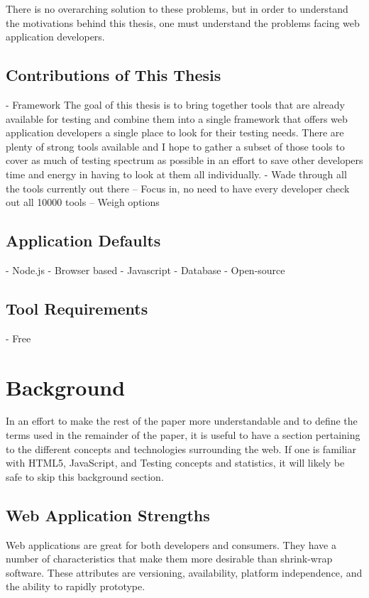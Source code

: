 \documentclass[11pt]{article}
\begin{document}
There is no overarching solution to these problems, but in order to understand the motivations behind this thesis, one must understand the problems facing web application developers.

\subsection{Contributions of This Thesis}
- Framework
The goal of this thesis is to bring together tools that are already available for testing and combine them into a single framework that offers web application developers a single place to look for their testing needs. There are plenty of strong tools available and I hope to gather a subset of those tools to cover as much of testing spectrum as possible in an effort to save other developers time and energy in having to look at them all individually.
- Wade through all the tools currently out there
-- Focus in, no need to have every developer check out all 10000 tools
-- Weigh options

\subsection{Application Defaults }
- Node.js
- Browser based
- Javascript
- Database
- Open-source

\subsection{Tool Requirements }
- Free

\section{Background}
In an effort to make the rest of the paper more understandable and to define the terms used in the remainder of the paper, it is useful to have a section pertaining to the different concepts and technologies surrounding the web.
If one is familiar with HTML5, JavaScript, and Testing concepts and statistics, it will likely be safe to skip this background section.

\subsection{Web Application Strengths}
Web applications are great for both developers and consumers. They have a number of characteristics that make them more desirable than shrink-wrap software. These attributes are versioning, availability, platform independence, and the ability to rapidly prototype.
\end{document}

